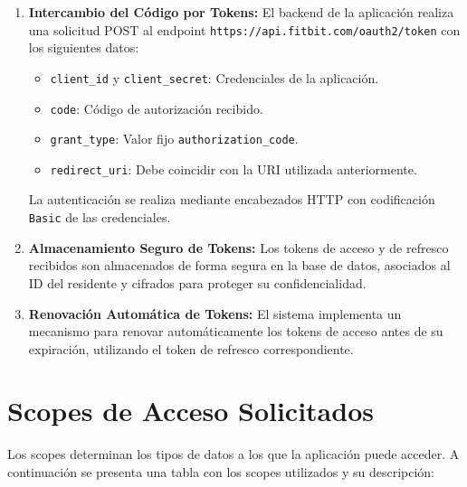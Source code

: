 \begin{enumerate}
    \item \textbf{Intercambio del Código por Tokens:} El backend de la aplicación realiza una solicitud POST al endpoint \texttt{https://api.fitbit.com/oauth2/token} con los siguientes datos:
    \begin{itemize}
        \item \texttt{client\_id} y \texttt{client\_secret}: Credenciales de la aplicación.
        \item \texttt{code}: Código de autorización recibido.
        \item \texttt{grant\_type}: Valor fijo \texttt{authorization\_code}.
        \item \texttt{redirect\_uri}: Debe coincidir con la URI utilizada anteriormente.
    \end{itemize}
    La autenticación se realiza mediante encabezados HTTP con codificación \texttt{Basic} de las credenciales.
    
    \item \textbf{Almacenamiento Seguro de Tokens:} Los tokens de acceso y de refresco recibidos son almacenados de forma segura en la base de datos, asociados al ID del residente y cifrados para proteger su confidencialidad.
    
    \item \textbf{Renovación Automática de Tokens:} El sistema implementa un mecanismo para renovar automáticamente los tokens de acceso antes de su expiración, utilizando el token de refresco correspondiente.
\end{enumerate}

\section{Scopes de Acceso Solicitados}

Los scopes determinan los tipos de datos a los que la aplicación puede acceder. A continuación se presenta una tabla con los scopes utilizados y su descripción:


